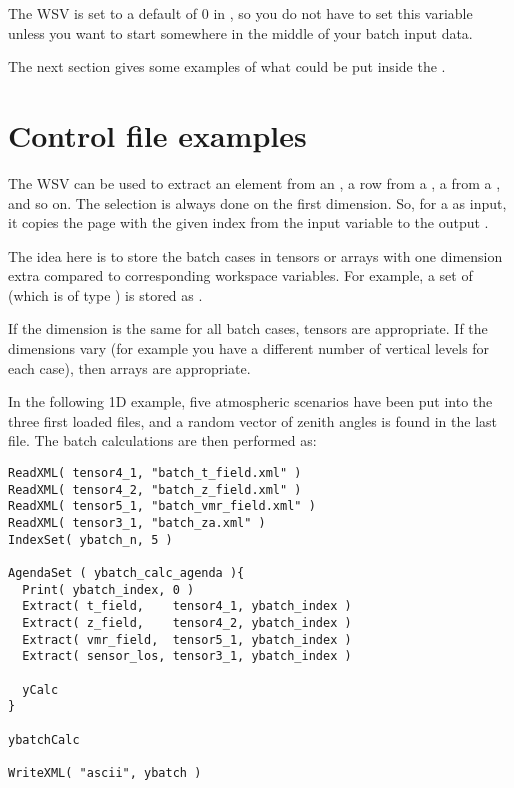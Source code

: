 The WSV  is set to a default of 0 in
, so you do not have to set this variable
unless you want to start somewhere in the middle of your batch input
data. 

The next section gives some examples of what could be put inside
the .

\section{Control file examples}
%
The WSV  can be used to extract an element from an
, a row from a , a
 from a , and so on. The
selection is always done on the first dimension. So, for a
 as input, it copies the page with the given index
from the input  variable to the output
.

The idea here is to store the batch cases in tensors or arrays with
one dimension extra compared to corresponding workspace variables. For
example, a set of  (which is of type
) is stored as .

If the dimension is the same for all batch cases, tensors are
appropriate. If the dimensions vary (for example you have a different
number of vertical levels for each case), then arrays are appropriate.

In the following 1D example, five atmospheric scenarios
have been put into the three first loaded files, and a random vector
of zenith angles is found in the last file. The batch calculations
are then performed as:

\begin{verbatim}
ReadXML( tensor4_1, "batch_t_field.xml" )
ReadXML( tensor4_2, "batch_z_field.xml" )
ReadXML( tensor5_1, "batch_vmr_field.xml" )
ReadXML( tensor3_1, "batch_za.xml" )
IndexSet( ybatch_n, 5 )

AgendaSet ( ybatch_calc_agenda ){
  Print( ybatch_index, 0 )
  Extract( t_field,    tensor4_1, ybatch_index )
  Extract( z_field,    tensor4_2, ybatch_index )
  Extract( vmr_field,  tensor5_1, ybatch_index )
  Extract( sensor_los, tensor3_1, ybatch_index )

  yCalc
}

ybatchCalc

WriteXML( "ascii", ybatch )
\end{verbatim}

